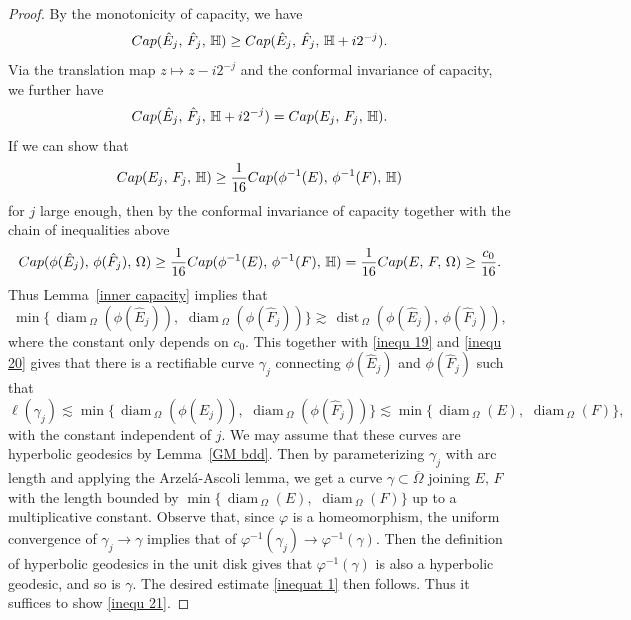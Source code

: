 \documentclass[10pt,a4paper]{amsart}
\def\diam{{\mathop\mathrm{\,diam\,}}}
\def\dist{{\mathop\mathrm{\,dist\,}}}
\def\ls{\lesssim}
\begin{document}
\begin{proof}
By the monotonicity of capacity, we have
$${\rm Cap}(\hat E_j,\,\hat F_j,\, \mathbb H)\ge {\rm Cap}(\hat E_j,\,\hat F_j,\, \mathbb H + i 2^{-j}  ). $$ 
Via the translation map $z\mapsto  z - i2^{-j}$ and the conformal invariance of capacity, we further have
$${\rm Cap}(\hat E_j,\, \hat F_j,\, \mathbb H + i 2^{-j} )={\rm Cap}(E_j,\, F_j,\,  \mathbb H). $$
 If we can show that
\begin{equation}\label{inequ 21}
{\rm Cap}(E_j,\, F_j,\,  \mathbb H)\ge \frac 1 {16} {\rm Cap}(\phi^{-1}(E) ,\, \phi^{-1}(F) ,\,  \mathbb H)
\end{equation}
for $j$ large enough, then by the conformal invariance of capacity together with the chain of inequalities above
$$ {\rm Cap}(\phi(\hat E_j),\,\phi(\hat F_j),\,\Omega )\ge \frac 1 {16} {\rm Cap}(\phi^{-1}(E) ,\, \phi^{-1}(F) ,\,  \mathbb H)= \frac 1 {16} {\rm Cap}( E ,\,  F  ,\,  \Omega)\ge \frac {c_0} {16}.$$
Thus Lemma~\ref{inner capacity} implies that
$${\min\{\diam_{\Omega}(\phi(\hat E_j)),\,\diam_{\Omega}(\phi(\hat F_j))\}}\gtrsim {\dist_{\Omega}(\phi(\hat E_j),\,\phi(\hat F_j))}, $$
where the constant only depends on $c_0$.
This together with \eqref{inequ 19} and  \eqref{inequ 20} gives that there is a rectifiable curve 
$\gamma_j$ connecting $\phi(\hat E_j)$ and $\phi(\hat F_j)$ such that
$$\ell(\gamma_j)\lesssim {\min\{\diam_{\Omega}(\phi(\hat E_j)),\,\diam_{\Omega}(\phi(\hat F_j))\}}\ls \min\{\diam_{\Omega}(E),\,\diam_{\Omega}(F)\},$$
with the constant independent of $j$. 
We may assume that these curves are hyperbolic geodesics by Lemma~\ref{GM bdd}.
Then by parameterizing $\gamma_j$ with arc length and applying the Arzel\'a-Ascoli lemma, we get a  curve $\gamma\subset \overline{\Omega}$ joining $E,\,F$ with the length bounded by $\min\{\diam_{\Omega}(E),\,\diam_{\Omega}(F)\}$ up to a multiplicative constant. Observe that, since $\varphi$ is a homeomorphism, the uniform convergence of $\gamma_j\to \gamma$ implies that of $\varphi^{-1}(\gamma_j)\to \varphi^{-1}(\gamma)$. Then the definition of hyperbolic geodesics in the unit disk gives that $\varphi^{-1}(\gamma)$ is also a hyperbolic geodesic, and so is  $\gamma$. 
The desired estimate \eqref{inequat 1} then follows. 
Thus it suffices to show \eqref{inequ 21}. 




\end{proof}
\end{document}
